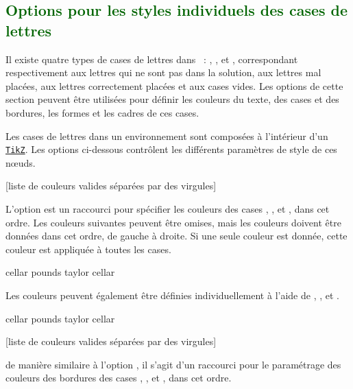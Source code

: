 \documentclass[svgnames]{report}
\newcommand\ctan[1]{\href{https://www.ctan.org/pkg/#1}{\texttt{#1}}}
\newcommand\Section[1]{\subsection{\textcolor{DarkGreen}{#1}}}
\begin{document}
  \Section{Options pour les styles individuels des cases de lettres}

  Il existe quatre types de cases de lettres dans  :
  , ,  et
  , correspondant respectivement aux lettres qui ne sont pas dans la solution,
  aux lettres mal placées, aux lettres correctement placées et aux cases vides. Les options de cette section peuvent être utilisées pour
  définir les couleurs du texte, des cases et des bordures, les formes et les cadres de ces cases.

  Les cases de lettres dans un environnement  sont composées à l'intérieur
  d'un \keyword{\node} \ctan{TikZ}. Les options ci-dessous contrôlent les
  différents paramètres de style de ces nœuds.

  [liste de couleurs valides séparées par des virgules]

  L'option  est un raccourci pour spécifier les
  couleurs des cases , ,  et
  , dans cet ordre. Les couleurs suivantes peuvent être omises, mais
  les couleurs doivent être données dans cet ordre, de gauche à droite.
  Si une seule couleur est donnée, cette couleur est appliquée à toutes les cases.

  \begin{example}
  \begin{wordle}[Couleurs={LightGray,Orange,Teal}]{cellar}
    pounds
    taylor
    cellar
  \end{wordle}
  \end{example}

  Les couleurs peuvent également être définies individuellement à l'aide de , ,  et .

  \begin{example}
  \begin{wordle}[couleur absent=DarkGray,couleur present=Salmon,
                 couleur correct=SeaGreen]{cellar}
    pounds
    taylor
    cellar
  \end{wordle}
  \end{example}

  [liste de couleurs valides séparées par des virgules]

  de manière similaire à l'option  , il s'agit d'un raccourci pour le paramétrage des couleurs des bordures des cases , ,
   et , dans cet ordre.
\end{document}

